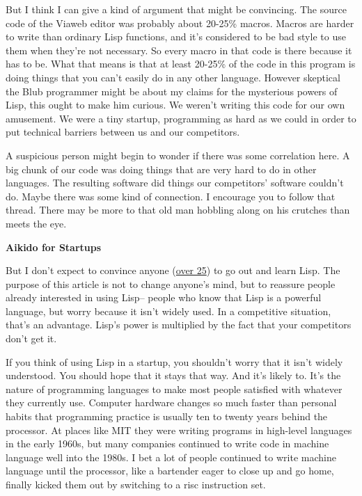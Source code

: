 \documentclass[12pt]{book}
\begin{document}
But I think I can give a kind of argument that might be convincing. The
source code of the Viaweb editor was probably about 20-25\% macros.
Macros are harder to write than ordinary Lisp functions, and it's
considered to be bad style to use them when they're not necessary. So
every macro in that code is there because it has to be. What that means
is that at least 20-25\% of the code in this program is doing things
that you can't easily do in any other language. However skeptical the
Blub programmer might be about my claims for the mysterious powers of
Lisp, this ought to make him curious. We weren't writing this code for
our own amusement. We were a tiny startup, programming as hard as we
could in order to put technical barriers between us and our competitors.

A suspicious person might begin to wonder if there was some correlation
here. A big chunk of our code was doing things that are very hard to do
in other languages. The resulting software did things our competitors'
software couldn't do. Maybe there was some kind of connection. I
encourage you to follow that thread. There may be more to that old man
hobbling along on his crutches than meets the eye.

\textbf{Aikido for Startups}

But I don't expect to convince anyone
(\href{http://www.trollope.org/scheme.html}{over 25}) to go out and
learn Lisp. The purpose of this article is not to change anyone's mind,
but to reassure people already interested in using Lisp-- people who
know that Lisp is a powerful language, but worry because it isn't widely
used. In a competitive situation, that's an advantage. Lisp's power is
multiplied by the fact that your competitors don't get it.

If you think of using Lisp in a startup, you shouldn't worry that it
isn't widely understood. You should hope that it stays that way. And
it's likely to. It's the nature of programming languages to make most
people satisfied with whatever they currently use. Computer hardware
changes so much faster than personal habits that programming practice is
usually ten to twenty years behind the processor. At places like MIT
they were writing programs in high-level languages in the early 1960s,
but many companies continued to write code in machine language well into
the 1980s. I bet a lot of people continued to write machine language
until the processor, like a bartender eager to close up and go home,
finally kicked them out by switching to a risc instruction set.
\end{document}
